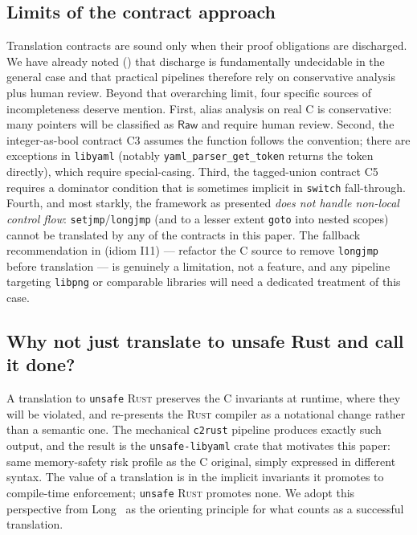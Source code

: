 \documentclass[12pt]{article}
\newcommand{\Raw}{\mathsf{Raw}}
\newcommand{\rust}{\textnormal{\textsc{Rust}}}
\newcommand{\clang}{\textnormal{\textsc{C}}}
\newcommand{\libyaml}{\texttt{libyaml}}
\newcommand{\unsafelibyaml}{\texttt{unsafe-libyaml}}
\theoremstyle{definition}
\theoremstyle{remark}
\begin{document}
\subsection{Limits of the contract approach}
Translation contracts are sound only when their proof obligations are discharged. We have already noted () that discharge is fundamentally undecidable in the general case and that practical pipelines therefore rely on conservative analysis plus human review. Beyond that overarching limit, four specific sources of incompleteness deserve mention. First, alias analysis on real \clang{} is conservative: many pointers will be classified as \(\Raw\) and require human review. Second, the integer-as-bool contract C3 assumes the function follows the convention; there are exceptions in \libyaml{} (notably \texttt{yaml\_parser\_get\_token} returns the token directly), which require special-casing. Third, the tagged-union contract C5 requires a dominator condition that is sometimes implicit in \texttt{switch} fall-through. Fourth, and most starkly, the framework as presented \emph{does not handle non-local control flow}: \texttt{setjmp}/\texttt{longjmp} (and to a lesser extent \texttt{goto} into nested scopes) cannot be translated by any of the contracts in this paper. The fallback recommendation in  (idiom I11) --- refactor the \clang{} source to remove \texttt{longjmp} before translation --- is genuinely a limitation, not a feature, and any pipeline targeting \texttt{libpng} or comparable libraries will need a dedicated treatment of this case.

\subsection{Why not just translate to unsafe Rust and call it done?}
A translation to \texttt{unsafe} \rust{} preserves the C invariants at runtime, where they will be violated, and re-presents the \rust{} compiler as a notational change rather than a semantic one. The mechanical \texttt{c2rust} pipeline produces exactly such output, and the result is the \unsafelibyaml{} crate that motivates this paper: same memory-safety risk profile as the \clang{} original, simply expressed in different syntax. The value of a translation is in the implicit invariants it promotes to compile-time enforcement; \texttt{unsafe} \rust{} promotes none. We adopt this perspective from Long~\cite{long2026c2rust} as the orienting principle for what counts as a successful translation.
\end{document}
